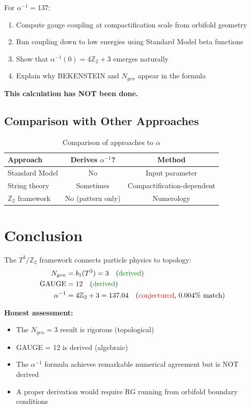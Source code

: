 \documentclass[12pt,a4paper]{article}
\begin{document}
For $\alpha^{-1} = 137$:
\begin{enumerate}
    \item Compute gauge coupling at compactification scale from orbifold geometry
    \item Run coupling down to low energies using Standard Model beta functions
    \item Show that $\alpha^{-1}(0) = 4\mathbb{Z}_2 + 3$ emerges naturally
    \item Explain why BEKENSTEIN and $N_{gen}$ appear in the formula
\end{enumerate}

\textbf{This calculation has NOT been done.}

\subsection{Comparison with Other Approaches}

\begin{table}[h]
\centering
\begin{tabular}{lcc}
\toprule
Approach & Derives $\alpha^{-1}$? & Method \\
\midrule
Standard Model & No & Input parameter \\
String theory & Sometimes & Compactification-dependent \\
$\mathbb{Z}_2$ framework & No (pattern only) & Numerology \\
\bottomrule
\end{tabular}
\caption{Comparison of approaches to $\alpha$}
\end{table}

\section{Conclusion}

The $T^3/\mathbb{Z}_2$ framework connects particle physics to topology:
\begin{align}
N_{gen} &= b_1(T^3) = 3 \quad \text{(\textcolor{green!50!black}{derived})} \\
\text{GAUGE} &= 12 \quad \text{(\textcolor{green!50!black}{derived})} \\
\alpha^{-1} &= 4\mathbb{Z}_2 + 3 = 137.04 \quad \text{(\textcolor{red}{conjectured}, 0.004\% match)}
\end{align}

\textbf{Honest assessment:}
\begin{itemize}
    \item The $N_{gen} = 3$ result is rigorous (topological)
    \item GAUGE = 12 is derived (algebraic)
    \item The $\alpha^{-1}$ formula achieves remarkable numerical agreement but is NOT derived
    \item A proper derivation would require RG running from orbifold boundary conditions
\end{itemize}
\end{document}

